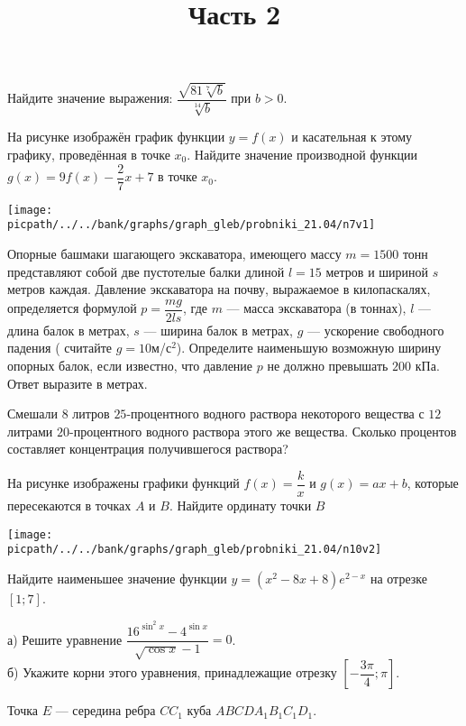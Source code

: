\begin{training}[2]
\begin{listofex}
		\item Найдите значение выражения: \( \dfrac{\sqrt{81\sqrt[7]{b}}}{\sqrt[14]{b}} \) при \( b>0 \).
		\foranswer
		\item
		На рисунке изображён график функции \( y=f(x) \) и касательная к этому графику, проведённая в точке \( x_0 \). Найдите значение производной функции \( g(x)=9f(x)-\dfrac{2}{7}x+7 \) в точке \( x_0 \).
		\begin{center}
			\texttt{[image: \\picpath/../../bank/graphs/graph\_gleb/probniki\_21.04/n7v1]}
		\end{center}
		\foranswer
		\hphantom{Часть 1}
		\newpage
		\item Опорные башмаки шагающего экскаватора, имеющего массу \( m=1500 \) тонн представляют собой две пустотелые балки длиной \( l=15 \) метров и шириной \( s \) метров каждая. Давление экскаватора на почву, выражаемое в килопаскалях, определяется формулой \( p=\dfrac{mg}{2ls} \), где \( m \) --- масса экскаватора (в тоннах), \( l \) ---длина балок в метрах, \( s \) --- ширина балок в метрах, \( g \) --- ускорение свободного падения ( считайте \( g=10 \)м/с\( ^2 \)). Определите наименьшую возможную ширину опорных балок, если известно, что давление \( p \) не должно превышать \( 200 \) кПа. Ответ выразите в метрах.
		\foranswer
		\item Смешали \( 8 \) литров \( 25 \)-процентного водного раствора некоторого вещества с \( 12 \) литрами \( 20 \)-процентного водного раствора этого же вещества. Сколько процентов составляет концентрация получившегося раствора?
		\foranswer
		\item 
		На рисунке изображены графики функций \( f(x)=\dfrac{k}{x} \) и \( g(x)=ax+b \), которые пересекаются в точках \( A \) и \( B \). Найдите ординату точки \( B \)
		\begin{center}
			\texttt{[image: \\picpath/../../bank/graphs/graph\_gleb/probniki\_21.04/n10v2]}
		\end{center}
		\foranswer
		\item Найдите наименьшее значение функции \( y=(x^2-8x+8)e^{2-x} \) на отрезке \( \left[ 1; 7\right]  \).
		\foranswer
		\egepreambtwo
		\title{Часть 2}
		\item а) Решите уравнение \( \dfrac{16^{\sin^2x}-4^{\sin x}}{\sqrt{\cos x}-1}=0\). \\
		б) Укажите корни этого уравнения, принадлежащие отрезку \( \left[ -\dfrac{3\pi}{4};\pi \right]  \).
		\item Точка \( E \) --- середина ребра \( CC_1 \) куба \( ABCDA_1B_1C_1D_1 \). \\

\end{listofex}
\end{training}
